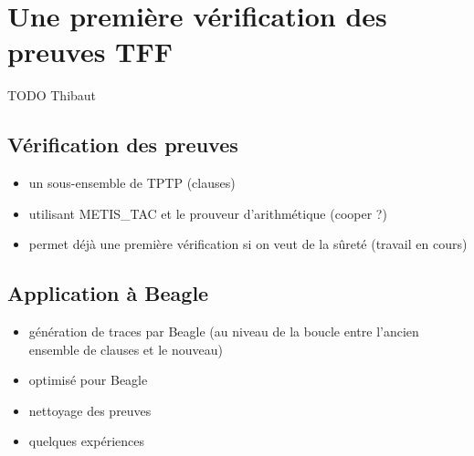 \section{Une première vérification des preuves TFF}

TODO Thibaut


\subsection{Vérification des preuves}

\begin{itemize}
\item un sous-ensemble de TPTP (clauses)
\item utilisant METIS\_TAC et le prouveur d'arithmétique (cooper ?)
\item permet déjà une première vérification si on veut de la sûreté
  (travail en cours)
\end{itemize}


\subsection{Application à Beagle}

\begin{itemize}
\item génération de traces par Beagle (au niveau de la boucle entre
  l'ancien ensemble de clauses et le nouveau)
\item optimisé pour Beagle
\item nettoyage des preuves
\item quelques expériences
\end{itemize}
